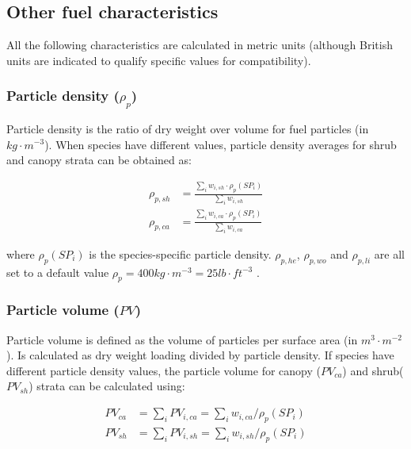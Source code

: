 \documentclass[]{book}
\begin{document}
\subsection{Other fuel
characteristics}\label{other-fuel-characteristics}

All the following characteristics are calculated in metric units
(although British units are indicated to qualify specific values for
compatibility).

\subsubsection{\texorpdfstring{Particle density
(\(\rho_{p}\))}{Particle density (\textbackslash{}rho\_\{p\})}}\label{particle-density-rho_p}

Particle density is the ratio of dry weight over volume for fuel
particles (in \(kg\cdot m^{-3}\)). When species have different values,
particle density averages for shrub and canopy strata can be obtained
as:

\begin{eqnarray}
\rho_{p, sh} &= \frac{\sum_{i}{w_{i,sh} \cdot \rho_p(SP_i)}}{\sum_{i}{w_{i,sh}}}\\
\rho_{p, ca} &= \frac{\sum_{i}{w_{i,ca} \cdot \rho_p(SP_i)}}{\sum_{i}{w_{i,ca}}}
\end{eqnarray}

where \(\rho_p(SP_i)\) is the species-specific particle density.
\(\rho_{p, he}\), \(\rho_{p, wo}\) and \(\rho_{p, li}\) are all set to a
default value \(\rho_{p} = 400 kg\cdot m^{-3}= 25 lb\cdot ft^{-3}\)
\citep{Prichard2013}.

\subsubsection{\texorpdfstring{Particle volume
(\(PV\))}{Particle volume (PV)}}\label{particle-volume-pv}

Particle volume is defined as the volume of particles per surface area
(in \(m^3\cdot m^{-2}\)). Is calculated as dry weight loading divided by
particle density. If species have different particle density values, the
particle volume for canopy (\(PV_{ca}\)) and shrub(\(PV_{sh}\)) strata
can be calculated using:

\begin{eqnarray}
PV_{ca} &= \sum_{i}{PV_{i,ca}} = \sum_{i}{w_{i,ca}/\rho_{p}(SP_i)}\\
PV_{sh} &= \sum_{i}{PV_{i,sh}} = \sum_{i}{w_{i,sh}/\rho_{p}(SP_i)}
\end{eqnarray}
\end{document}
